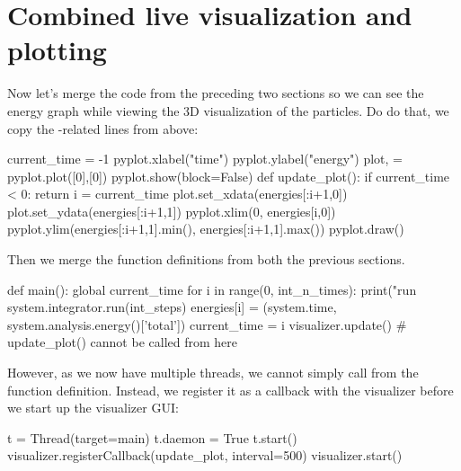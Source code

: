 \documentclass[
paper=a4,                       %
fontsize=11pt,                  %
twoside,                        %
footsepline,                    %
headsepline,                    %
headinclude=false,              %
footinclude=false,              %
pagesize,                       %
]{scrartcl}
\begin{document}
\section{Combined live visualization and plotting}

Now let's merge the code from the preceding two sections so we can see the energy graph while viewing the 3D visualization of the particles.
Do do that, we copy the -related lines from above:
\begin{pypresso}
current_time = -1
pyplot.xlabel("time")
pyplot.ylabel("energy")
plot, = pyplot.plot([0],[0])
pyplot.show(block=False)
def update_plot():
    if current_time < 0:
        return
    i = current_time
    plot.set_xdata(energies[:i+1,0])
    plot.set_ydata(energies[:i+1,1])
    pyplot.xlim(0, energies[i,0])
    pyplot.ylim(energies[:i+1,1].min(), energies[:i+1,1].max())
    pyplot.draw()
\end{pypresso}
Then we merge the  function definitions from both the previous sections.
\begin{pypresso}
def main():
    global current_time
    for i in range(0, int_n_times):
        print("run %
        system.integrator.run(int_steps)
        energies[i] = (system.time, system.analysis.energy()['total'])
        current_time = i
        visualizer.update()
        # update_plot() cannot be called from here
\end{pypresso}
However, as we now have multiple threads, we cannot simply call  from the  function definition.
Instead, we register it as a callback with the visualizer before we start up the visualizer GUI:
\begin{pypresso}
t = Thread(target=main)
t.daemon = True
t.start()
visualizer.registerCallback(update_plot, interval=500)
visualizer.start()
\end{pypresso}
\end{document}
